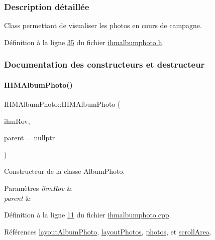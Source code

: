 \subsubsection{Description détaillée}
Class permettant de visualiser les photos en cours de campagne. 

Définition à la ligne \hyperlink{ihmalbumphoto_8h_source_l00035}{35} du fichier \hyperlink{ihmalbumphoto_8h_source}{ihmalbumphoto.\+h}.



\subsubsection{Documentation des constructeurs et destructeur}
\mbox{\label{class_i_h_m_album_photo_aefa56aaad40d6cb0ddcf769f149ab0ad}} 
\paragraph{\texorpdfstring{I\+H\+M\+Album\+Photo()}{IHMAlbumPhoto()}}
{\footnotesize\ttfamily I\+H\+M\+Album\+Photo\+::\+I\+H\+M\+Album\+Photo (\begin{DoxyParamCaption}\item[{\hyperlink{class_i_h_m_rov}{I\+H\+M\+Rov} $\ast$}]{ihm\+Rov,  }\item[{\hyperlink{class_q_widget}{Q\+Widget} $\ast$}]{parent = {\ttfamily nullptr} }\end{DoxyParamCaption})}



Constructeur de la classe Album\+Photo. 


\begin{DoxyParams}{Paramètres}
{\em ihm\+Rov} & \\
\hline
{\em parent} & \\
\hline
\end{DoxyParams}


Définition à la ligne \hyperlink{ihmalbumphoto_8cpp_source_l00011}{11} du fichier \hyperlink{ihmalbumphoto_8cpp_source}{ihmalbumphoto.\+cpp}.



Références \hyperlink{ihmalbumphoto_8h_source_l00041}{layout\+Album\+Photo}, \hyperlink{ihmalbumphoto_8h_source_l00040}{layout\+Photos}, \hyperlink{ihmalbumphoto_8h_source_l00039}{photos}, et \hyperlink{ihmalbumphoto_8h_source_l00042}{scroll\+Area}.


